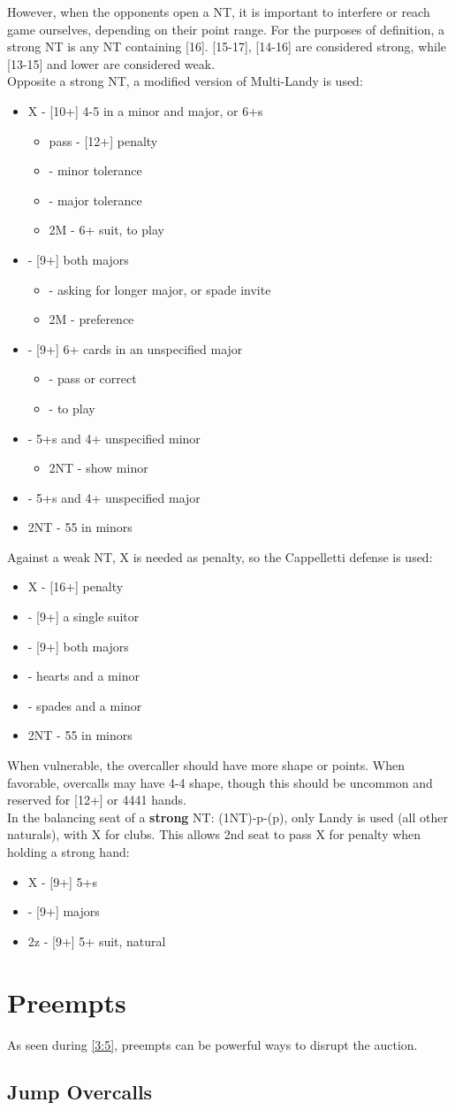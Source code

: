 \documentclass[12pt]{report}
\newcommand{\n}{\\}
\newcommand{\ul}[1]{\begin{itemize}#1\end{itemize}}
\newcommand{\li}{\item[~]}
\begin{document}
    However, when the opponents open a NT, it is important to interfere or reach game ourselves, depending on their point range.  For the purposes of definition, a strong NT is any NT containing [16].  [15-17], [14-16] are considered strong, while [13-15] and lower are considered weak. \n

    Opposite a strong NT, a modified version of Multi-Landy is used:
    \ul {
        \li X - [10+] 4-5 in a minor and major, or 6+\di{}s
        \ul {
            \li pass - [12+] penalty
            \li \cl2 - minor tolerance
            \li \di2 - major tolerance
            \li 2M - 6+ suit, to play
        }
        \li \cl2 - [9+] both majors
        \ul {
            \li \di2 - asking for longer major, or spade invite
            \li 2M - preference
        }
        \li \di2 - [9+] 6+ cards in an unspecified major
        \ul {
            \li \he2 - pass or correct
            \li \sp2 - to play
        }
        \li \he2 - 5+\he{}s and 4+ unspecified minor
        \ul {
            \li 2NT - show minor
        }
        \li \sp2 - 5+\sp{}s and 4+ unspecified major
        \li 2NT - 55 in minors
    }

    Against a weak NT, X is needed as penalty, so the Cappelletti defense is used:
    \ul {
        \li X - [16+] penalty
        \li {} - [9+] a single suitor
        \li \di2 - [9+] both majors
        \li \he2 - hearts and a minor
        \li \sp2 - spades and a minor
        \li 2NT - 55 in minors
    }

    When vulnerable, the overcaller should have more shape or points.  When favorable, overcalls may have 4-4 shape, though this should be uncommon and reserved for [12+] or 4441 hands. \n

    In the balancing seat of a \textbf{strong} NT: (1NT)-p-(p), only Landy is used (all other naturals), with X for clubs.  This allows 2nd seat to pass X for penalty when holding a strong hand:
    \ul {
        \li X - [9+] 5+\cl{}s
        \li {} - [9+] majors
        \li 2z - [9+] 5+ suit, natural
    }
\newpage

\section{Preempts} \label{4:5}

    As seen during \ref{3:5}, preempts can be powerful ways to disrupt the auction.

\subsection{Jump Overcalls}
    
\end{document}
